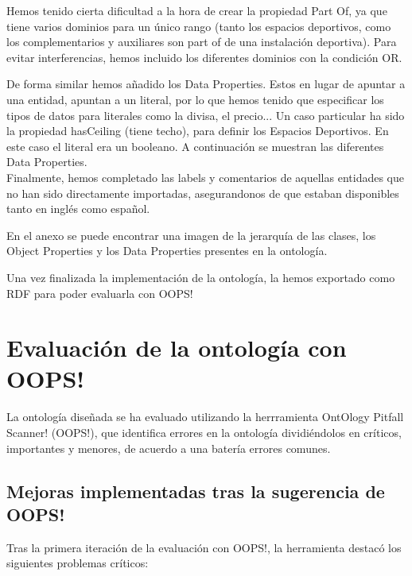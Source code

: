 \documentclass[a4paper,12pt]{article}
\begin{document}
	Hemos tenido cierta dificultad a la hora de crear la propiedad Part Of, ya que tiene varios dominios para un único rango (tanto los espacios deportivos, como los complementarios y auxiliares son part of de una instalación deportiva). Para evitar interferencias, hemos incluido los diferentes dominios con la condición OR. 
	
	De forma similar hemos añadido los Data Properties. Estos en lugar de apuntar a una entidad, apuntan a un literal, por lo que hemos tenido que especificar los tipos de datos para literales como la divisa, el precio... Un caso particular ha sido la propiedad hasCeiling (tiene techo), para definir los Espacios Deportivos. En este caso el literal era un booleano. A continuación se muestran las diferentes Data Properties. 
\\
	
	Finalmente, hemos completado las labels y comentarios de aquellas entidades que no han sido directamente importadas, asegurandonos de que estaban disponibles tanto en inglés como español. 
	
	En el anexo se puede encontrar una imagen de la jerarquía de las clases, los Object Properties y los Data Properties presentes en la ontología.
	
	Una vez finalizada la implementación de la ontología, la hemos exportado como RDF para poder evaluarla con OOPS!
	
	\section{Evaluación de la ontología con OOPS!}
	La ontología diseñada se ha evaluado utilizando la herrramienta OntOlogy Pitfall Scanner! (OOPS!)\cite{oops}, que identifica errores en la ontología dividiéndolos en críticos, importantes y menores, de acuerdo a una batería errores comunes.
	
	\subsection{Mejoras implementadas tras la sugerencia de OOPS!}
	
	Tras la primera iteración de la evaluación con OOPS!, la herramienta destacó los siguientes problemas críticos:
	
\end{document}
